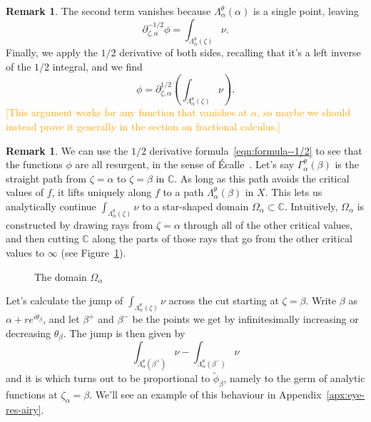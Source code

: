 \documentclass{article}
\newcommand{\C}{\mathbb{C}}
\newcommand{\fracderiv}[3]{\partial^{#1}_{#2, #3}}
\theoremstyle{definition}
\newtheorem{remark}[definition]{Remark}
\theoremstyle{plain}
\begin{document}
{\begin{remark}
    The second term vanishes because $\Lambda_\alpha^\theta(\alpha)$ is a single point, leaving
    \[ \fracderiv{-1/2}{\zeta}{\alpha} \phi = \int_{\Lambda_\alpha^\theta(\zeta)}\nu. \]
    Finally, we apply the $1/2$ derivative of both sides, recalling that it's a left inverse of the $1/2$ integral, and we find
    \begin{equation}\label{eqn:formula--1/2}\phi= \fracderiv{1/2}{\zeta}{\alpha} \left( \int_{\Lambda_\alpha^\theta(\zeta)}\nu \right).\end{equation}
    \textcolor{orange}{[This argument works for any function that vanishes at $\alpha$, so maybe we should instead prove it generally in the section on fractional calculus.]}
\end{remark}
\begin{remark}
We can use the $1/2$ derivative formula~\eqref{eqn:formula--1/2} to see that the functions $\phi$ are all resurgent, in the sense of \'{E}calle~\cite[Section~1]{EcalleI}. Let's say $\Gamma_\alpha^\theta(\beta)$ is the straight path from $\zeta = \alpha$ to $\zeta = \beta$ in $\C$. As long as this path avoids the critical values of $f$, it lifts uniquely along $f$ to a path $\Lambda_\alpha^\theta(\beta)$ in $X$. This lets us analytically continue $\int_{\Lambda_\alpha^\theta(\zeta)} \nu$ to a star-shaped domain $\Omega_\alpha \subset \C$. Intuitively, $\Omega_\alpha$ is constructed by drawing rays from $\zeta = \alpha$ through all of the other critical values, and then cutting $\C$ along the parts of those rays that go from the other critical values to $\infty$ (see Figure~\ref{Fig:slit domain}).
\begin{figure}
\center
{}
\caption{The domain $\Omega_\alpha$}\label{Fig:slit domain}
\end{figure}
Let's calculate the jump of $\int_{\Lambda_\alpha^\theta(\zeta)}\nu$ across the cut starting at $\zeta = \beta$. Write $\beta$ as $\alpha + re^{i\theta_\beta}$, and let $\beta^+$ and $\beta^-$ be the points we get by infinitesimally increasing or decreasing $\theta_\beta$. The jump is then given by \[\int_{\Lambda_\alpha^\theta(\beta^+)} \nu - \int_{\Lambda_\alpha^\theta(\beta^-)} \nu\] 
and it is 
which turns out to be proportional to $\tilde{\phi}_\beta$, namely to the germ of analytic functions at $\zeta_\alpha=\beta$. We'll see an example of this behaviour in Appendix~\ref{apx:eye-res-airy}. 



\end{remark}}
\end{document}
